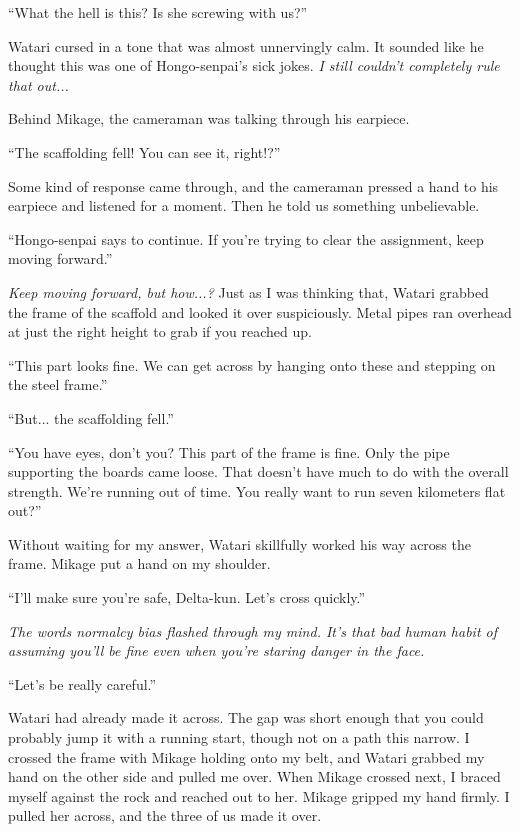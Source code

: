\documentclass[
    a4paper,
    12pt,
    twoside,
    openany,
    UTF8,
    fontset=windows
]{ctexbook}
\begin{document}
``What the hell is this? Is she screwing with us?''

Watari cursed in a tone that was almost unnervingly calm. It sounded like he thought this was one of Hongo-senpai's sick jokes. \textit{I still couldn't completely rule that out...}

Behind Mikage, the cameraman was talking through his earpiece.

``The scaffolding fell! You can see it, right!?''

Some kind of response came through, and the cameraman pressed a hand to his earpiece and listened for a moment. Then he told us something unbelievable.

``Hongo-senpai says to continue. If you're trying to clear the assignment, keep moving forward.''

\textit{Keep moving forward, but how...?} Just as I was thinking that, Watari grabbed the frame of the scaffold and looked it over suspiciously. Metal pipes ran overhead at just the right height to grab if you reached up.

``This part looks fine. We can get across by hanging onto these and stepping on the steel frame.''

``But... the scaffolding fell.''

``You have eyes, don't you? This part of the frame is fine. Only the pipe supporting the boards came loose. That doesn't have much to do with the overall strength. We're running out of time. You really want to run seven kilometers flat out?''

Without waiting for my answer, Watari skillfully worked his way across the frame. Mikage put a hand on my shoulder.

``I'll make sure you're safe, Delta-kun. Let's cross quickly.''

\textit{The words normalcy bias flashed through my mind. It's that bad human habit of assuming you'll be fine even when you're staring danger in the face.}

``Let's be really careful.''

Watari had already made it across. The gap was short enough that you could probably jump it with a running start, though not on a path this narrow. I crossed the frame with Mikage holding onto my belt, and Watari grabbed my hand on the other side and pulled me over. When Mikage crossed next, I braced myself against the rock and reached out to her. Mikage gripped my hand firmly. I pulled her across, and the three of us made it over.
\end{document}

